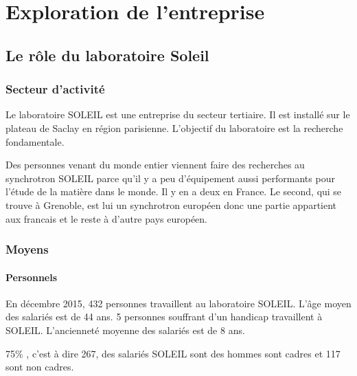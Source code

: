 \chapter{Exploration de l'entreprise}
	\minitoc






\section{Le rôle du laboratoire Soleil}

	\subsection{Secteur d'activité}
				Le laboratoire SOLEIL est une entreprise du secteur tertiaire. Il est installé sur le plateau de Saclay en région parisienne. L'objectif du laboratoire est la recherche fondamentale.
				
				Des personnes venant du monde entier viennent faire des recherches au synchrotron SOLEIL parce qu'il y a peu d'équipement aussi performants pour l'étude de la matière dans le monde. Il y en a deux en France. Le second, qui se trouve à Grenoble, est lui un synchrotron européen donc une partie appartient aux francais et le reste à d'autre pays européen.

	\subsection{Moyens}
		
		\subsubsection{Personnels}
				En décembre 2015, 432 personnes travaillent au laboratoire SOLEIL. L'âge moyen des salariés est de 44 ans. 5 personnes souffrant d'un handicap travaillent à SOLEIL. L'ancienneté moyenne des salariés est de 8 ans.
				
				75\% , c'est à dire 267, des salariés SOLEIL sont des hommes sont cadres et 117 sont non cadres.
				

